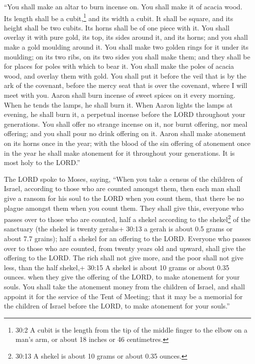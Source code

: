  ``You shall make an altar to burn incense on. You shall
make it of acacia wood.  Its length shall be a
cubit,\footnote{30:2 A cubit is the length from the tip of the middle
  finger to the elbow on a man's arm, or about 18 inches or 46
  centimetres.} and its width a cubit. It shall be square, and its
height shall be two cubits. Its horns shall be of one piece with it.
 You shall overlay it with pure gold, its top, its sides
around it, and its horns; and you shall make a gold moulding around it.
 You shall make two golden rings for it under its moulding;
on its two ribs, on its two sides you shall make them; and they shall be
for places for poles with which to bear it.  You shall make
the poles of acacia wood, and overlay them with gold.  You
shall put it before the veil that is by the ark of the covenant, before
the mercy seat that is over the covenant, where I will meet with you.
 Aaron shall burn incense of sweet spices on it every
morning. When he tends the lamps, he shall burn it.  When
Aaron lights the lamps at evening, he shall burn it, a perpetual incense
before the LORD throughout your generations.  You shall
offer no strange incense on it, nor burnt offering, nor meal offering;
and you shall pour no drink offering on it.  Aaron shall
make atonement on its horns once in the year; with the blood of the sin
offering of atonement once in the year he shall make atonement for it
throughout your generations. It is most holy to the LORD.''

 The LORD spoke to Moses, saying,  ``When you
take a census of the children of Israel, according to those who are
counted amongst them, then each man shall give a ransom for his soul to
the LORD when you count them, that there be no plague amongst them when
you count them.  They shall give this, everyone who passes
over to those who are counted, half a shekel according to the
shekel\footnote{30:13 A shekel is about 10 grams or about 0.35 ounces.}
of the sanctuary (the shekel is twenty gerahs+ 30:13 a gerah is about
0.5 grams or about 7.7 grains); half a shekel for an offering to the
LORD.  Everyone who passes over to those who are counted,
from twenty years old and upward, shall give the offering to the LORD.
 The rich shall not give more, and the poor shall not give
less, than the half shekel,+ 30:15 A shekel is about 10 grams or about
0.35 ounces. when they give the offering of the LORD, to make atonement
for your souls.  You shall take the atonement money from
the children of Israel, and shall appoint it for the service of the Tent
of Meeting; that it may be a memorial for the children of Israel before
the LORD, to make atonement for your souls.''

